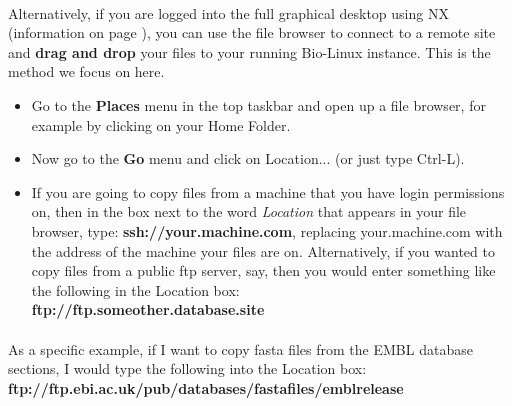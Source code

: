 \paragraph{}Alternatively, if you are logged into the full graphical desktop using NX (information on page \pageref{section:nx}), you can use the file browser to connect to a remote site and \textbf{drag and drop} your files to your running Bio-Linux instance. This is the method we focus on here.
\begin{itemize}

\item Go to the \textbf{Places} menu in the top taskbar and open up a file browser, for example by clicking on your Home Folder. 
\item Now go to the \textbf{Go} menu and click on Location... (or just type Ctrl-L). 
\item If you are going to copy files from a machine that you have login permissions on, then in the box next to the word \emph{Location} that appears in your file browser, type:
\textbf{ssh://your.machine.com}, replacing your.machine.com with the address of the machine your files are on. Alternatively, if you wanted to copy files from a public ftp server, say, then you would enter something like the following in the Location box: 
\\\textbf{ftp://ftp.someother.database.site}
\end{itemize}

\paragraph{}As a specific example, if I want to copy fasta files from the EMBL database sections, I would type the following into the Location box: 
\\\textbf{ftp://ftp.ebi.ac.uk/pub/databases/fastafiles/emblrelease}

